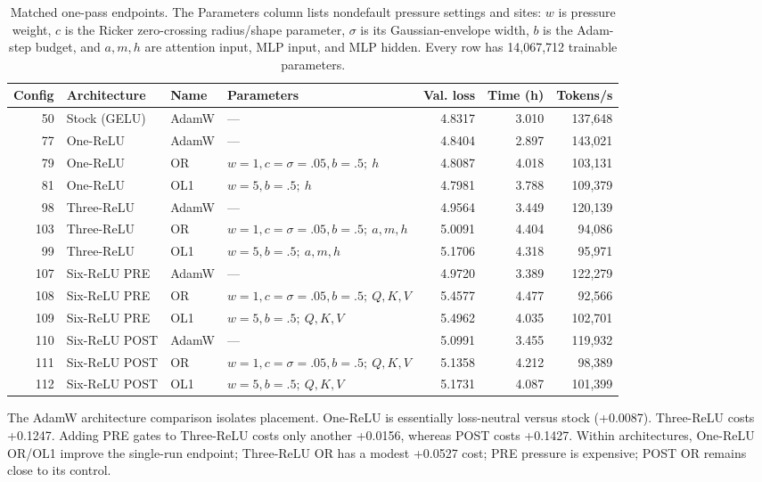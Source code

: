 \documentclass[10pt]{article}
\begin{document}
\begin{table}[H]
\centering
\caption{Matched one-pass endpoints. The Parameters column lists nondefault pressure settings and sites: $w$ is pressure weight, $c$ is the Ricker zero-crossing radius/shape parameter, $\sigma$ is its Gaussian-envelope width, $b$ is the Adam-step budget, and $a,m,h$ are attention input, MLP input, and MLP hidden. Every row has 14,067,712 trainable parameters.}
\label{tab:endpoints}
\scriptsize
\setlength{\tabcolsep}{3.8pt}
\begin{tabularx}{\textwidth}{rllXrrr}
\toprule
Config & Architecture & Name & Parameters & Val. loss & Time (h) & Tokens/s \\
\midrule
50  & Stock (GELU) & AdamW & --- & 4.8317 & 3.010 & 137,648 \\
77  & One-ReLU & AdamW & --- & 4.8404 & 2.897 & 143,021 \\
79  & One-ReLU & OR & $w=1,c=\sigma=.05,b=.5;\ h$ & 4.8087 & 4.018 & 103,131 \\
81  & One-ReLU & OL1 & $w=5,b=.5;\ h$ & 4.7981 & 3.788 & 109,379 \\
98  & Three-ReLU & AdamW & --- & 4.9564 & 3.449 & 120,139 \\
103 & Three-ReLU & OR & $w=1,c=\sigma=.05,b=.5;\ a,m,h$ & 5.0091 & 4.404 & 94,086 \\
99  & Three-ReLU & OL1 & $w=5,b=.5;\ a,m,h$ & 5.1706 & 4.318 & 95,971 \\
107 & Six-ReLU PRE & AdamW & --- & 4.9720 & 3.389 & 122,279 \\
108 & Six-ReLU PRE & OR & $w=1,c=\sigma=.05,b=.5;\ Q,K,V$ & 5.4577 & 4.477 & 92,566 \\
109 & Six-ReLU PRE & OL1 & $w=5,b=.5;\ Q,K,V$ & 5.4962 & 4.035 & 102,701 \\
110 & Six-ReLU POST & AdamW & --- & 5.0991 & 3.455 & 119,932 \\
111 & Six-ReLU POST & OR & $w=1,c=\sigma=.05,b=.5;\ Q,K,V$ & 5.1358 & 4.212 & 98,389 \\
112 & Six-ReLU POST & OL1 & $w=5,b=.5;\ Q,K,V$ & 5.1731 & 4.087 & 101,399 \\
\bottomrule
\end{tabularx}
\end{table}

The AdamW architecture comparison isolates placement. One-ReLU is essentially loss-neutral versus stock (+0.0087). Three-ReLU costs +0.1247. Adding PRE gates to Three-ReLU costs only another +0.0156, whereas POST costs +0.1427. Within architectures, One-ReLU OR/OL1 improve the single-run endpoint; Three-ReLU OR has a modest +0.0527 cost; PRE pressure is expensive; POST OR remains close to its control.
\end{document}
